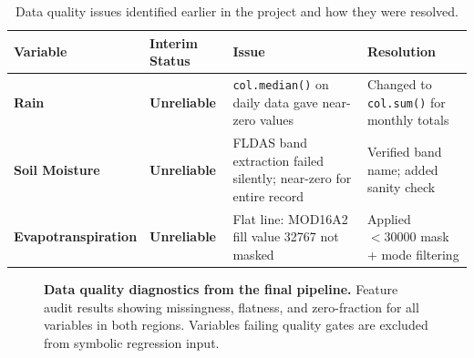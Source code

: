 \documentclass[12pt, a4paper]{article}
\begin{document}
\begin{table}[H]
\centering
\caption{Data quality issues identified earlier in the project and how they were resolved.}
\label{tab:dataquality}
\begin{tabularx}{\textwidth}{>{\bfseries}l l X X}
\toprule
Variable & Interim Status & Issue & Resolution \\
\midrule
Rain &
\textcolor{warnred}{\textbf{Unreliable}} &
\texttt{col.median()} on daily data gave near-zero values &
Changed to \texttt{col.sum()} for monthly totals \\

Soil Moisture &
\textcolor{warnred}{\textbf{Unreliable}} &
FLDAS band extraction failed silently; near-zero for entire record &
Verified band name; added sanity check \\

Evapotranspiration &
\textcolor{warnred}{\textbf{Unreliable}} &
Flat line: MOD16A2 fill value 32767 not masked &
Applied $<30000$ mask + mode filtering \\
\bottomrule
\end{tabularx}
\end{table}

\begin{figure}[H]
    \centering
    \caption{\textbf{Data quality diagnostics from the final pipeline.} Feature audit results showing missingness, flatness, and zero-fraction for all variables in both regions. Variables failing quality gates are excluded from symbolic regression input.}
    \label{fig:data_quality}
\end{figure}


\end{document}
